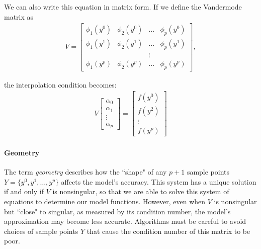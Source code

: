 We can also write this equation in matrix form.
If we define the Vandermode matrix as
\begin{align}
\label{vandermonde}
V=
\begin{bmatrix}
    \phi_1(y^0)      & \phi_2(y^0)       & \ldots & \phi_{p}(y^0)      \\
    \phi_1(y^1)      & \phi_2(y^1)       & \dots  & \phi_{p}(y^1)      \\
                     &                   & \vdots &                    \\
    \phi_1(y^{p})    & \phi_2(y^{p})     & \ldots & \phi_{p}(y^{p})
\end{bmatrix},
\end{align}

the interpolation condition becomes:
\begin{align}
V
\begin{bmatrix}
    \alpha_0     \\
    \alpha_1     \\
    \vdots       \\
    \alpha_p
\end{bmatrix}
=
\begin{bmatrix}
    f(y^0)     \\
    f(y^2)     \\
    \vdots     \\
    f(y^p)
\end{bmatrix}
\end{align}

\paragraph{Geometry}
\label{geometry}
The term \emph{geometry} describes how the ``shape" of any $p+1$ sample points $Y = \{y^0, y^1, \ldots, y^p\}$ affects the model's accuracy.
This system has a unique solution if and only if $V$ is nonsingular, so that we are able to solve this system of equations to determine our model functions.
However, even when $V$ is nonsingular but ``close" to singular, as measured by its condition number, the model's approximation may become less accurate.
Algorithms must be careful to avoid choices of sample points $Y$ that cause the condition number of this matrix to be poor.

